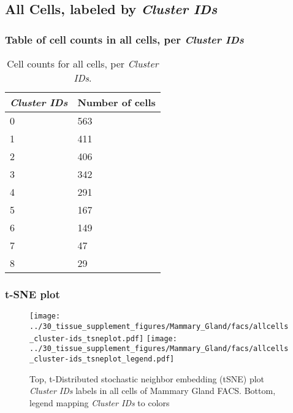 \subsection{All Cells, labeled by \emph{Cluster IDs}}
\subsubsection{Table of cell counts in all cells, per \emph{Cluster IDs}}\begin{table}[h]
\centering
\label{my-label}
\begin{tabular}{@{}ll@{}}
\toprule

\emph{Cluster IDs}& Number of cells \\ \midrule
0 & 563 \\

1 & 411 \\

2 & 406 \\

3 & 342 \\

4 & 291 \\

5 & 167 \\

6 & 149 \\

7 & 47 \\

8 & 29 \\
\bottomrule
\end{tabular}
\caption{Cell counts for all cells, per \emph{Cluster IDs}.}
\end{table}

\clearpage
\subsubsection{t-SNE plot}
\begin{figure}[h]
\centering
\texttt{[image: ../30\_tissue\_supplement\_figures/Mammary\_Gland/facs/allcells\_cluster-ids\_tsneplot.pdf]}
\texttt{[image: ../30\_tissue\_supplement\_figures/Mammary\_Gland/facs/allcells\_cluster-ids\_tsneplot\_legend.pdf]}
\caption{Top, t-Distributed stochastic neighbor embedding (tSNE) plot  \emph{Cluster IDs} labels in all cells of Mammary Gland FACS. Bottom, legend mapping \emph{Cluster IDs} to colors}
\end{figure}


\clearpage

